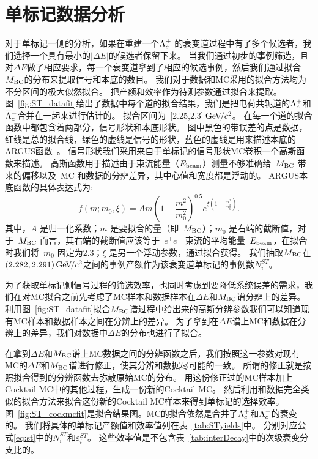 \section{单标记数据分析}
对于单标记一侧的分析，如果在重建一个$\Lambda_{c}^{\pm}$ 的衰变道过程中有了多个候选者，我们选择一个具有最小的$|\Delta{}E|$的候选者保留下来。
当我们通过初步的事例筛选，且对$\Delta{}E$做了相应要求，每一个衰变道拿到了相应的候选事例，然后我们通过拟合$M_{\rm BC}$的分布来提取信号和本底的数目。
我们对于数据和MC采用的拟合方法均为不分区间的极大似然拟合。
把产额和效率作为待测参数通过拟合来提取。
图~\ref{fig:ST_datafit}给出了数据中每个道的拟合结果，我们是把电荷共轭道的$\Lambda_{c}^{+}$和$\overline{\Lambda}{}_{c}^{-}$合并在一起来进行估计的。
拟合区间为~[2.25,2.3]${\mathrm{\,Ge\kern -0.1em V\!/}c^2}$。 
在每一个道的拟合函数中都包含着两部分，信号形状和本底形状。
图中黑色的带误差的点是数据，红线是总的拟合线，绿色的虚线是信号的形状，蓝色的虚线是用来描述本底的ARGUS函数~\cite{ref:argus}。
信号形状我们采用来自于单标记的信号形状MC卷积一个高斯函数来描述。
高斯函数用于描述由于束流能量（$E_{\rm beam}$）测量不够准确给~$M_{\rm BC}$ 带来的偏移以及~MC 和数据的分辨差异，其中心值和宽度都是浮动的。
ARGUS本底函数的具体表达式为:
\begin{equation}
f(m;m_{0},\xi)=Am(1-\frac{m^{2}}{m^{2}_{0}})^{0.5} e^{\xi(1-\frac{m^{2}}{m_{0}^{2}})}.
\end{equation}
其中，$A$ 是归一化系数；$m$ 是要拟合的量（即~$M_{\rm BC}$）；$m_{0}$ 是右端的截断值，对于~$M_{\rm BC}$ 而言，其右端的截断值应该等于~$e^{+}e^{-}$ 束流的平均能量~$E_{\rm beam}$，在拟合时我们将~$m_{0}$ 固定为$2.3$；$\xi$ 是另一个浮动参数，通过拟合获得。
我们抽取$M_{\rm BC}$在$(2.282, 2.291){\mathrm{\,Ge\kern -0.1em V\!/}c^2}$之间的事例产额作为该衰变道单标记的事例数$N_{i}^{ST}$。

为了获取单标记侧信号过程的筛选效率，也同时考虑到要降低系统误差的需求，我们在对MC拟合之前先考虑了MC样本和数据样本在$\Delta E$和$M_{\rm BC}$谱分辨上的差异。
利用图~\ref{fig:ST_datafit}拟合$M_{\rm BC}$谱过程中给出来的高斯分辨参数我们可以知道现有MC样本和数据样本之间在分辨上的差异。
为了拿到在$\Delta E$谱上MC和数据在分辨上的差异，我们对数据中$\Delta E$的分布也进行了拟合。

在拿到$\Delta E$和$M_{\rm BC}$谱上MC数据之间的分辨函数之后，我们按照这一参数对现有MC的$\Delta E$和$M_{\rm BC}$谱进行修正，使其分辨和数据尽可能的一致。
所谓的修正就是按照拟合得到的分辨函数去弥散原始MC的分布。
用这份修正过的MC样本加上Cocktail MC中的其他过程，生成一份新的Cocktail MC。
然后利用和数据完全类似的拟合方法来拟合这份新的Cocktail MC样本来得到单标记的选择效率。
图~\ref{fig:ST_cockmcfit}是拟合结果图。MC的拟合依然是合并了$\Lambda_{c}^{+}$和$\overline{\Lambda}{}_{c}^{-}$的衰变的。
我们将具体的单标记产额值和效率值列在表~\ref{tab:STyields}中。
分别对应公式\ref{eq:st}中的$N_{i}^{ST}$和$\varepsilon_{i}^{ST}$。
这些效率值是不包含表~\ref{tab:interDecay}中的次级衰变分支比的。

